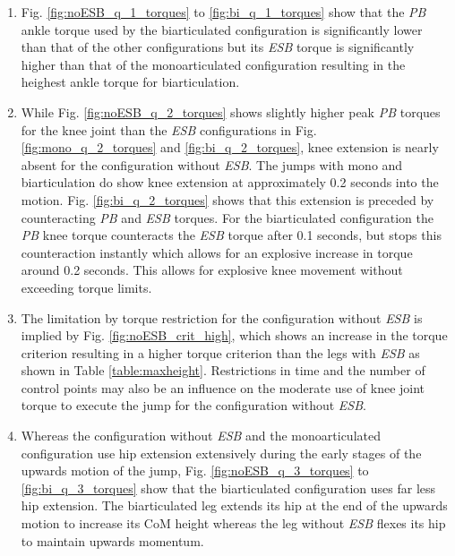 \documentclass[letterpaper, 10 pt, conference]{ieeeconf}  %
\begin{document}

\begin{enumerate}
	\item Fig. \ref{fig:noESB_q_1_torques} to \ref{fig:bi_q_1_torques} show that the \textit{PB} ankle torque used by the biarticulated configuration is significantly lower than that of the other configurations but its \textit{ESB} torque is significantly higher than that of the monoarticulated configuration resulting in the heighest ankle torque for biarticulation. 
	
	\item While Fig. \ref{fig:noESB_q_2_torques} shows slightly higher peak \textit{PB} torques for the knee joint than the \textit{ESB} configurations in Fig. \ref{fig:mono_q_2_torques} and \ref{fig:bi_q_2_torques}, knee extension is nearly absent for the configuration without \textit{ESB}. The jumps with mono and biarticulation do show knee extension at approximately 0.2 seconds into the motion. Fig. \ref{fig:bi_q_2_torques} shows that this extension is preceded by counteracting \textit{PB} and \textit{ESB} torques. For the biarticulated configuration the \textit{PB} knee torque counteracts the \textit{ESB} torque after 0.1 seconds, but stops this counteraction instantly which allows for an explosive increase in torque around 0.2 seconds. This allows for explosive knee movement without exceeding torque limits.
	
	\item The limitation by torque restriction for the configuration without \textit{ESB} is implied by Fig. \ref{fig:noESB_crit_high}, which shows an increase in the torque criterion resulting in a higher torque criterion than the legs with \textit{ESB} as shown in Table \ref{table:maxheight}. Restrictions in time and the number of control points may also be an influence on the moderate use of knee joint torque to execute the jump for the configuration without \textit{ESB}.
	
	\item Whereas the configuration without \textit{ESB} and the monoarticulated configuration use hip extension extensively during the early stages of the upwards motion of the jump, Fig. \ref{fig:noESB_q_3_torques} to \ref{fig:bi_q_3_torques} show that the biarticulated configuration uses far less hip extension. The biarticulated leg extends its hip at the end of the upwards motion to increase its CoM height whereas the leg without \textit{ESB} flexes its hip to maintain upwards momentum.
	

\end{enumerate}
\end{document}
